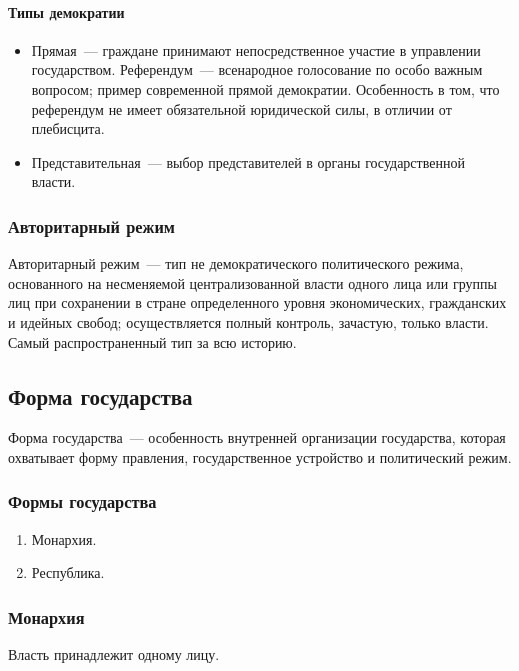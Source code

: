 \documentclass[12pt]{article}
\begin{document}
	\paragraph{Типы демократии}
	\begin{itemize}
		\item Прямая~--- граждане принимают непосредственное участие в управлении государством. Референдум~--- всенародное голосование по особо важным вопросом; пример современной прямой демократии. Особенность в том, что референдум не имеет обязательной юридической силы, в отличии от плебисцита.
		\item Представительная~--- выбор представителей в органы государственной власти.
	\end{itemize}
	\subsubsection{Авторитарный режим}
	\begin{definition}
		Авторитарный режим~--- тип не демократического политического режима, основанного на несменяемой централизованной власти одного лица или группы лиц при сохранении в стране определенного уровня экономических, гражданских и идейных свобод; осуществляется полный контроль, зачастую, только власти. Самый распространенный тип за всю историю.
	\end{definition}
	\subsection{Форма государства}
	\begin{definition}
		Форма государства~--- особенность внутренней организации государства, которая охватывает форму правления, государственное устройство и политический режим.
	\end{definition}
	\subsubsection{Формы государства}
	\begin{enumerate}
		\item Монархия.
		\item Республика.
	\end{enumerate}
	\subsubsection{Монархия}
	\begin{definition}[Монархия]
		Власть принадлежит одному лицу.
	\end{definition}
\end{document}
